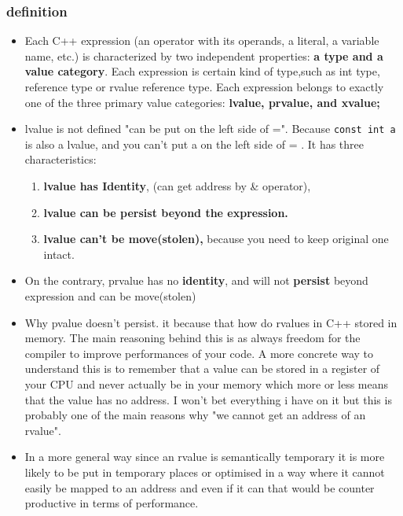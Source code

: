 \documentclass[a4paper,12pt,twoside]{book}
\begin{document}
\subsubsection{definition}

\begin{itemize}
	\item Each C++ expression (an operator with its operands, a literal, a variable name, etc.) is characterized by two independent properties: \textbf{a type and a value category}. Each expression is certain kind of type,such as int type, reference type or rvalue reference type. Each expression belongs to exactly one of the three primary value categories: \textbf{lvalue, prvalue, and xvalue;} 
	
	\item lvalue is not defined "can be put on the left side of =". Because \texttt{const int a} is also a lvalue, and you can't put a on the left side of = . It has three characteristics:
	\begin{enumerate}
		\item\textbf{lvalue has Identity}, (can get address by \& operator),
		\item \textbf{lvalue can be persist beyond the expression. }
		\item \textbf{lvalue can't be move(stolen),} because you need to keep original one intact.
	\end{enumerate}
	
	\item On the contrary, prvalue has no \textbf{identity}, and will not \textbf{persist} beyond expression and can be move(stolen)
	
	\item Why pvalue doesn't persist. it because that how do rvalues in C++ stored in memory. The main reasoning behind this is as always freedom for the compiler to improve performances of your code. A more concrete way to understand this is to remember that a value can be stored in a register of your CPU and never actually be in your memory which more or less means that the value has no address. I won't bet everything i have on it but this is probably one of the main reasons why "we cannot get an address of an rvalue".
	
	\item In a more general way since an rvalue is semantically temporary it is more likely to be put in temporary places or optimised in a way where it cannot easily be mapped to an address and even if it can that would be counter productive in terms of performance.
	

\end{itemize}
\end{document}
